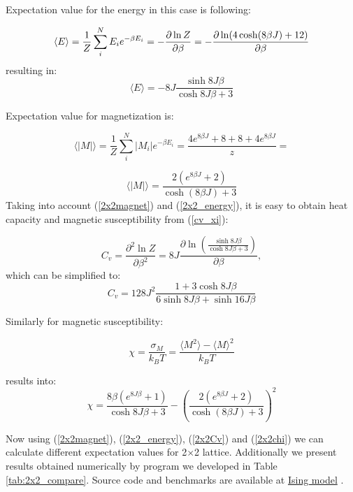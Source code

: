 \documentclass[10pt]{article}
\begin{document}
Expectation value for the energy in this case is following:

\[
\langle E\rangle =\frac{1}{Z}\sum_{i}^{N}E_{i}e^{-\beta E_{i}}=-\frac{%
\partial \ln Z}{\partial \beta }=-\frac{\partial \ln (4\cosh (8\beta J)+12)}{%
\partial \beta }
\]
resulting in:
\begin{equation}\label{2x2_energy}
\langle E\rangle=-8J\frac{\sinh 8J\beta }{\cosh 8J\beta +3}
\end{equation}

Expectation value for magnetization is:

\[
\langle \left\vert M\right\vert \rangle =\frac{1}{Z}\sum_{i}^{N}\left\vert
M_{i}\right\vert e^{-\beta E_{i}}=\frac{4e^{8\beta J}+8+8+4e^{8\beta J}}{z}=%
\]

\begin{equation}\label{2x2magnet}
\langle \left\vert M\right\vert \rangle=\frac{2(e^{8\beta J}+2)}{\cosh (8\beta J)+3}
\end{equation}
Taking into account (\ref{2x2magnet}) and (\ref{2x2_energy}), it is easy to obtain heat capacity and
magnetic susceptibility from (\ref{cv_xi}):

\[
C_{v}=\frac{\partial ^{2}\ln Z}{\partial\beta ^{2}}=8J\frac{\partial \ln (\frac{\sinh 8J\beta }{\cosh 8J\beta +3})}{\partial \beta },
\]
which can be simplified to:
\begin{equation}\label{2x2Cv}
C_{v}=128J^{2}\frac{1+3\cosh 8J\beta }{6\sinh 8J\beta +\sinh 16J\beta }
\end{equation}

Similarly for magnetic susceptibility:

\[
\chi=\frac{\sigma _{M}}{k_{B}T}=\frac{\langle M^{2}\rangle -\langle M\rangle ^{2}}{k_{B}T}
\]

results into:
\begin{equation}\label{2x2chi}
\chi=\frac{8\beta (e^{8J\beta }+1)}{\cosh 8J\beta +3}-\left( \frac{2(e^{8\beta J}+2)}{\cosh (8\beta J)+3}\right) ^{2}
\end{equation}

Now using (\ref{2x2magnet}), (\ref{2x2_energy}), (\ref{2x2Cv}) and (\ref{2x2chi}) we can calculate different expectation values for 2$\times$2 lattice. Additionally we present results obtained numerically by program we developed in Table \ref{tab:2x2_compare}. Source code and benchmarks are available at 
\href{https://github.com/andrei-fys/fys4150/tree/master/Project_4/src/task_b_c}{Ising model} .
\end{document}
